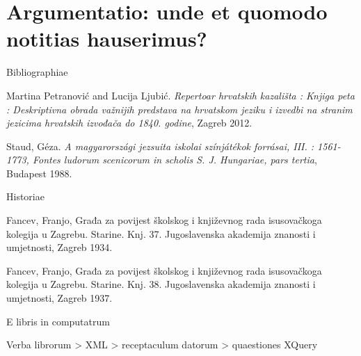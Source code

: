 \documentclass[14pt]{beamer}
\begin{document}
\section{Argumentatio: unde et quomodo notitias hauserimus?}

\begin{frame}{Bibliographiae}

Martina Petranović and Lucija Ljubić. \emph{Repertoar hrvatskih kazališta : Knjiga peta : Deskriptivna obrada važnijih predstava na hrvatskom jeziku i izvedbi na stranim jezicima hrvatskih izvođača do 1840. godine}, Zagreb 2012.

Staud, Géza. \emph{A magyarországi jezsuita iskolai színjátékok forrásai, III. : 1561-1773, Fontes ludorum scenicorum in scholis S. J. Hungariae, pars tertia}, Budapest 1988.

\end{frame}
\begin{frame}{Historiae}

Fancev, Franjo, Građa za povijest školskog i književnog rada
isusovačkoga kolegija u Zagrebu. Starine. Knj. 37. Jugoslavenska
akademija znanosti i umjetnosti, Zagreb 1934.

Fancev, Franjo, Građa za povijest školskog i književnog rada
isusovačkoga kolegija u Zagrebu. Starine. Knj. 38. Jugoslavenska
akademija znanosti i umjetnosti, Zagreb 1937.

\end{frame}

\begin{frame}{E libris in computatrum}

Verba librorum > XML > receptaculum datorum > quaestiones XQuery

\end{frame}

{
    \begin{frame}[plain]
    \end{frame}
    }









  \maketitle
\end{document}
